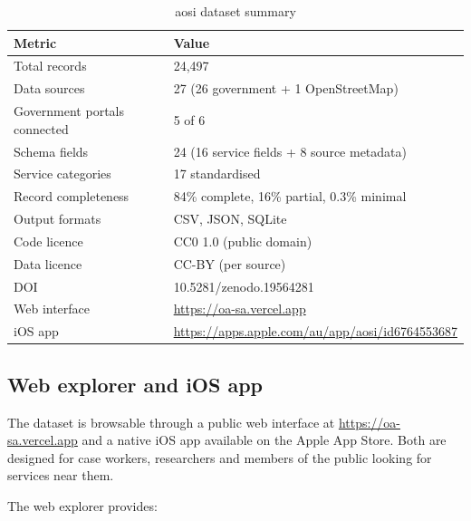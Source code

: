 \documentclass[11pt,a4paper]{article}
\newcommand{\theadstyle}{\cellcolor{headerbg}\textbf}
\begin{document}
\begin{table}[ht!]
\centering
\begin{tabular}{@{}ll@{}}
\toprule
\rowcolor{headerbg} \theadstyle{Metric} & \theadstyle{Value} \\
\midrule
Total records & 24,497 \\
Data sources & 27 (26 government + 1 OpenStreetMap) \\
Government portals connected & 5 of 6 \\
Schema fields & 24 (16 service fields + 8 source metadata) \\
Service categories & 17 standardised \\
Record completeness & 84\% complete, 16\% partial, 0.3\% minimal \\
Output formats & CSV, JSON, SQLite \\
Code licence & CC0 1.0 (public domain) \\
Data licence & CC-BY (per source) \\
DOI & 10.5281/zenodo.19564281 \\
Web interface & \url{https://oa-sa.vercel.app} \\
iOS app & \url{https://apps.apple.com/au/app/aosi/id6764553687} \\
\bottomrule
\end{tabular}
\caption{aosi dataset summary}
\end{table}

\subsection{Web explorer and iOS app}

The dataset is browsable through a public web interface at \url{https://oa-sa.vercel.app} and a native iOS app available on the Apple App Store. Both are designed for case workers, researchers and members of the public looking for services near them.

The web explorer provides:
\end{document}
